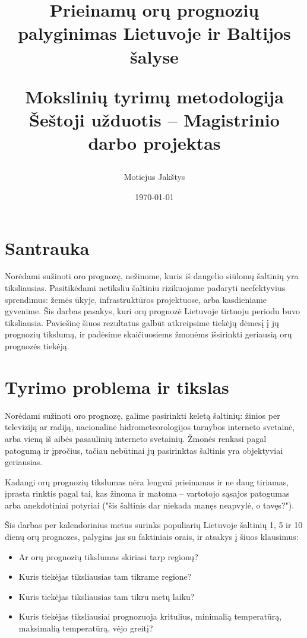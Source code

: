 \documentclass{article}
\title{
    Prieinamų orų prognozių palyginimas Lietuvoje ir Baltijos šalyse \\ \vspace{4mm}

    \large Mokslinių tyrimų metodologija\\
    Šeštoji užduotis -- Magistrinio darbo projektas
}
\author{Motiejus Jakštys}
\date{\today}
\begin{document}
\maketitle

\newpage

\section{Santrauka}

Norėdami sužinoti oro prognozę, nežinome, kuris iš daugelio siūlomų šaltinių
yra tiksliausias. Pasitikėdami netiksliu šaltiniu rizikuojame padaryti
neefektyvius sprendimus: žemės ūkyje, infrastruktūros projektuose, arba
kasdieniame gyvenime. Šis darbas pasakys, kuri orų prognozė Lietuvoje tirtuoju
periodu buvo tiksliausia. Paviešinę šiuos rezultatus galbūt atkreipsime tiekėjų
dėmesį į jų prognozių tikslumą, ir padėsime skaičiuosiems žmonėms išsirinkti
geriausią orų prognozės tiekėją.

\section{Tyrimo problema ir tikslas}
\label{sec:problema-ir-tikslas}

Norėdami sužinoti oro prognozę, galime pasirinkti keletą šaltinių: žinios per
televiziją ar radiją, nacionalinė hidrometeorologijos tarnybos interneto
svetainė, arba vieną iš aibės pasaulinių interneto svetainių. Žmonės renkasi
pagal patogumą ir įpročius, tačiau nebūtinai jų pasirinktas šaltinis yra
objektyviai geriausias.

Kadangi orų prognozių tikslumas nėra lengvai prieinamas ir ne daug tiriamas,
įprasta rinktis pagal tai, kas žinoma ir matoma -- vartotojo sąsajos patogumas
arba anekdotiniai potyriai ("šis šaltinis dar niekada manęs neapvylė, o
tavęs?").

Šis darbas per kalendorinius metus surinks populiarių Lietuvoje šaltinių 1, 5
ir 10 dienų orų prognozes, palygins jas su faktiniais orais, ir atsakys į šiuos
klausimus:

\begin{itemize}
    \item Ar orų prognozių tikslumas skiriasi tarp regionų?
    \item Kuris tiekėjas tiksliausias tam tikrame regione?
    \item Kuris tiekėjas tiksliausias tam tikru metų laiku?
    \item Kuris tiekėjas tiksliausiai prognozuoja kritulius, minimalią
        temperatūrą, maksimalią temperatūrą, vėjo greitį?
\end{itemize}
\end{document}
